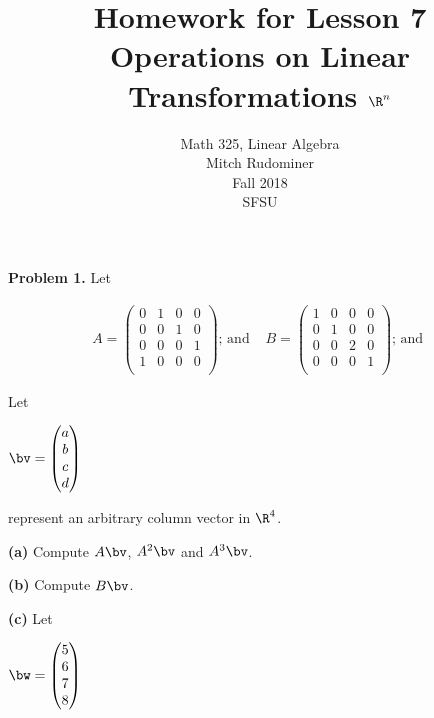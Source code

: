 \documentclass[oneside,12pt]{amsart}
\begin{document}
\title{Homework for Lesson 7 \\ Operations on Linear Transformations $\R^n$}
\author{Math 325, Linear Algebra \\ Mitch Rudominer \\ Fall 2018 \\ SFSU }
\date{}

\maketitle

\textbf{Problem 1.} Let

\smallskip

$$
\begin{matrix}
A = \begin{pmatrix}
0 & 1 & 0 & 0\\
0 & 0 & 1 & 0\\
0 & 0 & 0 & 1\\
1 & 0 & 0 & 0\\
\end{pmatrix}
\text{; and }
&
B = \begin{pmatrix}
1 & 0 & 0 & 0\\
0 & 1 & 0 & 0\\
0 & 0 & 2 & 0\\
0 & 0 & 0 & 1\\
\end{pmatrix}
\text{; and }
\end{matrix}
$$

 Let

\smallskip

$
\bv = \begin{pmatrix}
a \\
b \\
c \\
d \\
\end{pmatrix}
$

represent an arbitrary column vector in $\R^4$.

\smallskip

\textbf{(a)} Compute $A \bv$, $A^2 \bv$ and $A^3 \bv$.

\bigskip
\bigskip
\bigskip
\bigskip
\bigskip
\bigskip

\textbf{(b)} Compute $B \bv$.

\bigskip
\bigskip
\bigskip
\bigskip
\bigskip
\bigskip

\textbf{(c)} Let

\smallskip

$
\bw = \begin{pmatrix}
5 \\
6 \\
7 \\
8 \\
\end{pmatrix}
$
\bigskip
\bigskip
\bigskip
\end{document}
